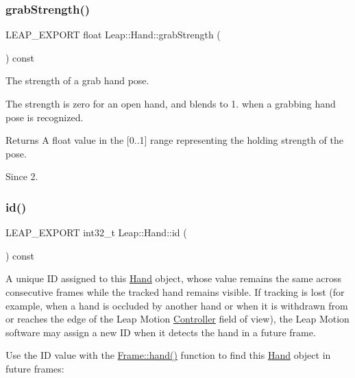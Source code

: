 \subsubsection{\texorpdfstring{grab\+Strength()}{grabStrength()}}
{\footnotesize\ttfamily L\+E\+A\+P\+\_\+\+E\+X\+P\+O\+RT float Leap\+::\+Hand\+::grab\+Strength (\begin{DoxyParamCaption}{ }\end{DoxyParamCaption}) const}

The strength of a grab hand pose.

The strength is zero for an open hand, and blends to 1. when a grabbing hand pose is recognized.


\begin{DoxyCodeInclude}
\end{DoxyCodeInclude}


\begin{DoxyReturn}{Returns}
A float value in the \mbox{[}0..1\mbox{]} range representing the holding strength of the pose. 
\end{DoxyReturn}
\begin{DoxySince}{Since}
2. 
\end{DoxySince}
\mbox{\label{class_leap_1_1_hand_a8ef8fb5d06e31b5aa3cc19548d3af205}} 
\subsubsection{\texorpdfstring{id()}{id()}}
{\footnotesize\ttfamily L\+E\+A\+P\+\_\+\+E\+X\+P\+O\+RT int32\+\_\+t Leap\+::\+Hand\+::id (\begin{DoxyParamCaption}{ }\end{DoxyParamCaption}) const}

A unique ID assigned to this \hyperlink{class_leap_1_1_hand}{Hand} object, whose value remains the same across consecutive frames while the tracked hand remains visible. If tracking is lost (for example, when a hand is occluded by another hand or when it is withdrawn from or reaches the edge of the Leap Motion \hyperlink{class_leap_1_1_controller}{Controller} field of view), the Leap Motion software may assign a new ID when it detects the hand in a future frame.

Use the ID value with the \hyperlink{class_leap_1_1_frame_aa5bfff6dba5e38bb779716ec309f1966}{Frame\+::hand()} function to find this \hyperlink{class_leap_1_1_hand}{Hand} object in future frames\+:


